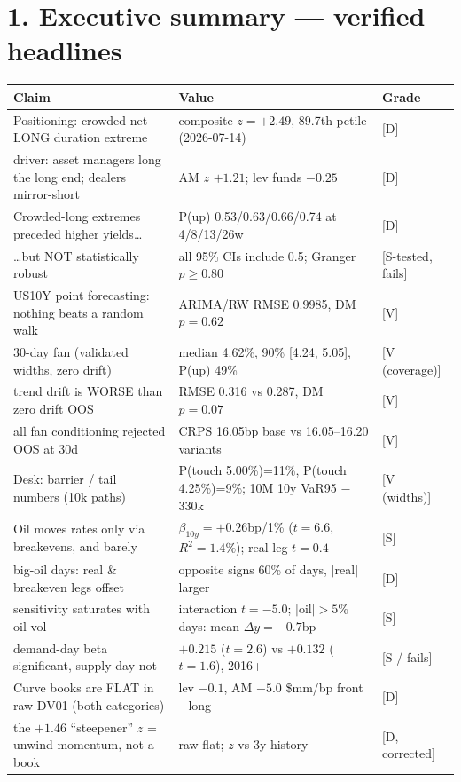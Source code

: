 \documentclass[10pt,a4paper]{article}
\newcommand{\grade}[1]{{\footnotesize\color{biggrey}[#1]}}
\newcommand{\sect}[1]{\section*{\color{bigorange}#1}}
\begin{document}
\sect{1. Executive summary --- verified headlines}
\begin{tabular}{p{8.6cm}p{4.4cm}l}
\toprule
Claim & Value & Grade\\
\midrule
Positioning: crowded net-LONG duration extreme & composite $z=+2.49$, 89.7th pctile (2026-07-14) & \grade{D}\\
\quad driver: asset managers long the long end; dealers mirror-short & AM $z$ $+1.21$; lev funds $-0.25$ & \grade{D}\\
Crowded-long extremes preceded higher yields\ldots & P(up) 0.53/0.63/0.66/0.74 at 4/8/13/26w & \grade{D}\\
\quad \ldots but NOT statistically robust & all 95\% CIs include 0.5; Granger $p{\ge}0.80$ & \grade{S-tested, fails}\\
US10Y point forecasting: nothing beats a random walk & ARIMA/RW RMSE 0.9985, DM $p{=}0.62$ & \grade{V}\\
30-day fan (validated widths, zero drift) & median 4.62\%, 90\% [4.24, 5.05], P(up) 49\% & \grade{V (coverage)}\\
\quad trend drift is WORSE than zero drift OOS & RMSE 0.316 vs 0.287, DM $p{=}0.07$ & \grade{V}\\
\quad all fan conditioning rejected OOS at 30d & CRPS 16.05bp base vs 16.05--16.20 variants & \grade{V}\\
Desk: barrier / tail numbers (10k paths) & P(touch 5.00\%)=11\%, P(touch 4.25\%)=9\%; 10M 10y VaR95 $-$330k & \grade{V (widths)}\\
Oil moves rates only via breakevens, and barely & $\beta_{10y}=+0.26$bp/1\% ($t{=}6.6$, $R^2{=}1.4\%$); real leg $t{=}0.4$ & \grade{S}\\
\quad big-oil days: real \& breakeven legs offset & opposite signs 60\% of days, $|$real$|$ larger & \grade{D}\\
\quad sensitivity saturates with oil vol & interaction $t{=}-5.0$; $|$oil$|{>}5\%$ days: mean $\Delta y=-0.7$bp & \grade{S}\\
\quad demand-day beta significant, supply-day not & $+0.215$ ($t{=}2.6$) vs $+0.132$ ($t{=}1.6$), 2016+ & \grade{S / fails}\\
Curve books are FLAT in raw DV01 (both categories) & lev $-0.1$, AM $-5.0$ \$mm/bp front$-$long & \grade{D}\\
\quad the $+1.46$ ``steepener'' $z$ = unwind momentum, not a book & raw flat; $z$ vs 3y history & \grade{D, corrected}\\
\bottomrule
\end{tabular}
\end{document}
